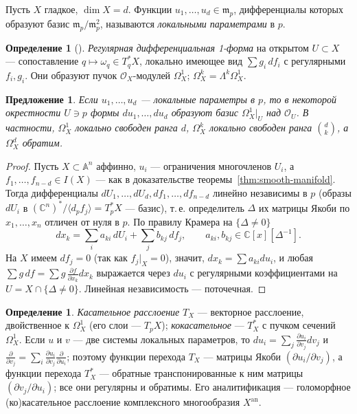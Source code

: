 \documentclass[11pt,a4paper]{article}
\theoremstyle{plain}
\newtheorem{proposition}[theorem]{Предложение}
\theoremstyle{definition}
\newtheorem{definition}[theorem]{Определение}
\theoremstyle{remark}
\renewcommand{\C}{\mathbb{C}}
\newcommand{\A}{\mathbb{A}}
\newcommand{\cO}{\mathcal{O}}
\newcommand{\mm}{\mathfrak{m}}
\newcommand{\an}{\mathrm{an}}
\begin{document}
Пусть $X$ гладкое, $\dim X=d$. Функции $u_1,\dots,u_d\in\mm_p$, дифференциалы которых образуют
базис $\mm_p/\mm_p^2$, называются \emph{локальными параметрами} в $p$.

\begin{definition}[{\cite[II.3]{Sh}}]
\emph{Регулярная дифференциальная 1-форма} на открытом $U\subset X$ --- сопоставление $q\mapsto
\omega_q\in T_q^*X$, локально имеющее вид $\sum g_i\,df_i$ с регулярными $f_i,g_i$. Они
образуют пучок $\cO_X$-модулей $\Omega^1_X$; $\Omega^k_X=\Lambda^k\Omega^1_X$.
\end{definition}

\begin{proposition}\label{prop:local-params}
Если $u_1,\dots,u_d$ --- локальные параметры в $p$, то в некоторой окрестности $U\ni p$ формы
$du_1,\dots,du_d$ образуют базис $\Omega^1_X|_U$ над $\cO_U$. В частности, $\Omega^1_X$ локально
свободен ранга $d$, $\Omega^k_X$ локально свободен ранга $\binom dk$, а $\Omega^d_X$ обратим.
\end{proposition}
\begin{proof}
Пусть $X\subset\A^n$ аффинно, $u_i$ --- ограничения многочленов $U_i$, а
$f_1,\dots,f_{n-d}\in I(X)$ --- как в доказательстве теоремы~\ref{thm:smooth-manifold}. Тогда
дифференциалы $dU_1,\dots,dU_d,df_1,\dots,df_{n-d}$ линейно независимы в $p$ (образы $dU_i$ в
$(\C^n)^*/\langle d_pf_j\rangle=T_p^*X$ --- базис), т.\,е. определитель $\Delta$ их матрицы Якоби
по $x_1,\dots,x_n$ отличен от нуля в $p$. По правилу Крамера на $\{\Delta\neq0\}$
\[
dx_k=\sum_i a_{ki}\,dU_i+\sum_j b_{kj}\,df_j,\qquad a_{ki},b_{kj}\in\C[x][\Delta^{-1}].
\]
На $X$ имеем $df_j=0$ (так как $f_j|_X=0$), значит, $dx_k=\sum a_{ki}du_i$, и любая
$\sum g\,df=\sum g\,\frac{\partial f}{\partial x_k}dx_k$ выражается через $du_i$ с регулярными
коэффициентами на $U=X\cap\{\Delta\ne0\}$. Линейная независимость --- поточечная.
\end{proof}

\begin{definition}
\emph{Касательное расслоение} $T_X$ --- векторное расслоение, двойственное к $\Omega^1_X$ (его
слои --- $T_pX$); \emph{кокасательное} --- $T^*_X$ с пучком сечений $\Omega^1_X$. Если $u$ и $v$ ---
две системы локальных параметров, то $du_i=\sum_j\frac{\partial u_i}{\partial v_j}dv_j$ и
$\frac{\partial}{\partial v_j}=\sum_i\frac{\partial u_i}{\partial v_j}\frac{\partial}{\partial u_i}$; поэтому функции
перехода $T_X$ --- матрицы Якоби $(\partial u_i/\partial v_j)$, а функции перехода $T^*_X$ --- обратные
транспонированные к ним матрицы $(\partial v_j/\partial u_i)$; все они регулярны и обратимы.
Его аналитификация --- голоморфное (ко)касательное расслоение комплексного многообразия
$X^{\an}$.
\end{definition}
\end{document}
